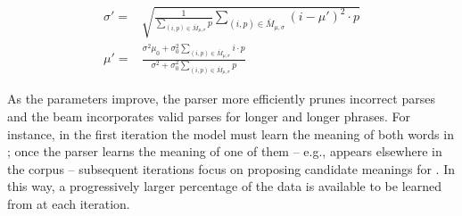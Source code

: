 \begin{align}
	\sigma' =& \sqrt{
		\frac{ 1 } { \sum\limits_{(i,p) \in \bar M_{\mu,\sigma}}  p }
		\sum\limits_{(i,p) \in \bar M_{\mu,\sigma}} (i-\mu')^2 \cdot p
	} \\
	\mu' =&
		\frac{
			\sigma^2 \mu_0 + \sigma_0^2 \sum_{(i,p) \in \bar M_{\mu,\sigma}}  i \cdot p
		}{
			\sigma^2 + \sigma_0^2 \sum_{(i,p) \in \bar M_{\mu,\sigma}} p 
		}
\label{eqn:gaussianEM}
\end{align}

As the parameters improve, the parser more efficiently prunes incorrect parses
	and the beam incorporates valid parses for longer and longer phrases.
For instance, in the first iteration the model must learn the meaning of both
	words in ; once the parser learns the meaning of one of them
	-- e.g.,  appears elsewhere in the corpus -- subsequent iterations
	focus on proposing candidate meanings for .
In this way, a progressively larger percentage of the data is available to be
	learned from at each iteration.

%
%


